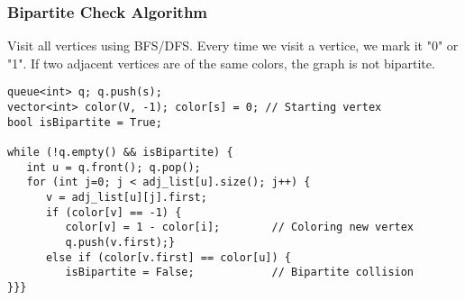 \begin{frame}[fragile]
  \frametitle{Bipartite Check Algorithm}
  Visit all vertices using BFS/DFS. Every time we visit a vertice, we mark it "0" or "1". If two adjacent vertices are of the same colors, the graph is not bipartite.

  {\smaller
  \begin{exampleblock}{}
\begin{verbatim}
queue<int> q; q.push(s);
vector<int> color(V, -1); color[s] = 0; // Starting vertex
bool isBipartite = True;

while (!q.empty() && isBipartite) {
   int u = q.front(); q.pop();
   for (int j=0; j < adj_list[u].size(); j++) {
      v = adj_list[u][j].first;
      if (color[v] == -1) {
         color[v] = 1 - color[i];        // Coloring new vertex
         q.push(v.first);}
      else if (color[v.first] == color[u]) {
         isBipartite = False;            // Bipartite collision
}}}
\end{verbatim}
  \end{exampleblock}
  }
\end{frame}

